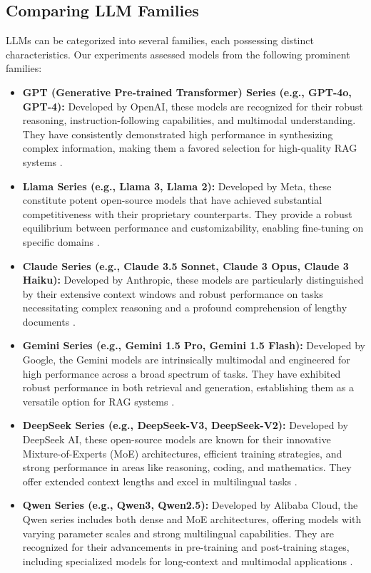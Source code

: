 \subsection{Comparing LLM Families}
LLMs can be categorized into several families, each possessing distinct characteristics. Our experiments assessed models from the following prominent families:
\begin{itemize}
    \item \textbf{GPT (Generative Pre-trained Transformer) Series (e.g., GPT-4o, GPT-4):} Developed by OpenAI, these models are recognized for their robust reasoning, instruction-following capabilities, and multimodal understanding. They have consistently demonstrated high performance in synthesizing complex information, making them a favored selection for high-quality RAG systems \autocite{openai2024gpt4technicalreport}.
    \item \textbf{Llama Series (e.g., Llama 3, Llama 2):} Developed by Meta, these constitute potent open-source models that have achieved substantial competitiveness with their proprietary counterparts. They provide a robust equilibrium between performance and customizability, enabling fine-tuning on specific domains \autocite{touvron2023llama, grattafiori2024llama3herdmodels}.
    \item \textbf{Claude Series (e.g., Claude 3.5 Sonnet, Claude 3 Opus, Claude 3 Haiku):} Developed by Anthropic, these models are particularly distinguished by their extensive context windows and robust performance on tasks necessitating complex reasoning and a profound comprehension of lengthy documents \autocite{anthropic2024claude3}.
    \item \textbf{Gemini Series (e.g., Gemini 1.5 Pro, Gemini 1.5 Flash):} Developed by Google, the Gemini models are intrinsically multimodal and engineered for high performance across a broad spectrum of tasks. They have exhibited robust performance in both retrieval and generation, establishing them as a versatile option for RAG systems \autocite{gemini2025}.
    \item \textbf{DeepSeek Series (e.g., DeepSeek-V3, DeepSeek-V2):} Developed by DeepSeek AI, these open-source models are known for their innovative Mixture-of-Experts (MoE) architectures, efficient training strategies, and strong performance in areas like reasoning, coding, and mathematics. They offer extended context lengths and excel in multilingual tasks \autocite{deepseekai2025deepseekv3technicalreport}.
    \item \textbf{Qwen Series (e.g., Qwen3, Qwen2.5):} Developed by Alibaba Cloud, the Qwen series includes both dense and MoE architectures, offering models with varying parameter scales and strong multilingual capabilities. They are recognized for their advancements in pre-training and post-training stages, including specialized models for long-context and multimodal applications \autocite{yang2025qwen3technicalreport, qwen2025qwen25technicalreport}.
\end{itemize}

